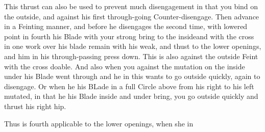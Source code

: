 This thrust can also be used to prevent much disengagement in that you
bind on the outside, and against his first through-going
Counter-disengage. Then advance in a Feinting manner, and before he
disengages the second time, with lowered point in fourth his Blade
with your strong bring to the insideand with the cross in one work
over his blade remain with his weak, and thust to the lower openings,
and him in his through-passing press down. This is also against the
outside Feint with the cross doable. And also when you against the
mutation on the inside under his Blade went through and he in this
wants to go outside quickly, again to disengage. Or when he his BLade
in a full Circle above from his right to his left mutated, in that he
his Blade inside and under bring, you go outside quickly and thrust
his right hip.


Thus is fourth applicable to the lower openings, when she in
